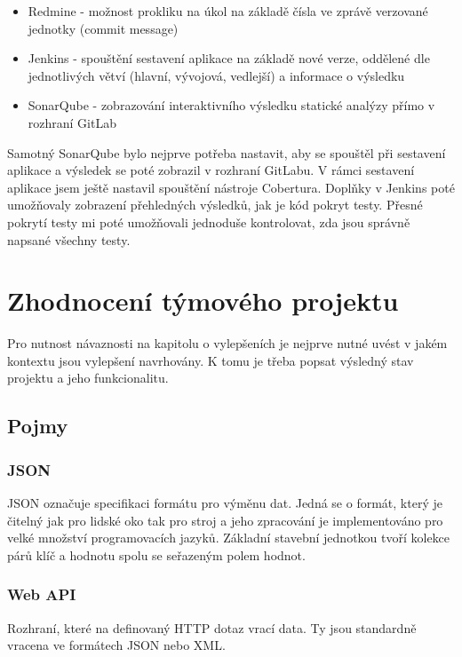 \documentclass[thesis=B,czech]{FITthesis}[2012/06/26]
\begin{document}
\begin{itemize}
\item Redmine - možnost prokliku na úkol na základě čísla ve zprávě verzované jednotky (commit message)
\item Jenkins - spouštění sestavení aplikace na základě nové verze, oddělené dle jednotlivých větví (hlavní, vývojová, vedlejší) a
				informace o výsledku
\item SonarQube - zobrazování interaktivního výsledku statické analýzy přímo v rozhraní GitLab
\end{itemize}

Samotný SonarQube bylo nejprve potřeba nastavit, aby se spouštěl při sestavení aplikace a výsledek se poté zobrazil v rozhraní
GitLabu. V rámci sestavení aplikace jsem ještě nastavil spouštění nástroje Cobertura.
Doplňky v Jenkins poté umožňovaly zobrazení přehledných výsledků, jak je kód pokryt testy. Přesné pokrytí testy mi poté umožňovali 
jednoduše kontrolovat, zda jsou správně napsané všechny testy.

\chapter{Zhodnocení týmového projektu}
Pro nutnost návaznosti na kapitolu o vylepšeních je nejprve nutné uvést v jakém kontextu jsou vylepšení navrhovány. K tomu je třeba
popsat výsledný stav projektu a jeho funkcionalitu. 

\section{Pojmy}

\subsection{JSON}
JSON označuje specifikaci formátu pro výměnu dat\cite{JSON}. Jedná se o formát, který je čitelný jak pro lidské oko tak pro stroj\cite{JSON} a jeho zpracování je implementováno pro velké množství programovacích jazyků\cite{JSON-impl}. Základní stavební jednotkou
tvoří kolekce párů klíč a hodnotu spolu se seřazeným polem hodnot.

\subsection{Web API}
Rozhraní, které na definovaný HTTP dotaz vrací data. Ty jsou standardně vracena ve formátech JSON nebo XML.
\end{document}
